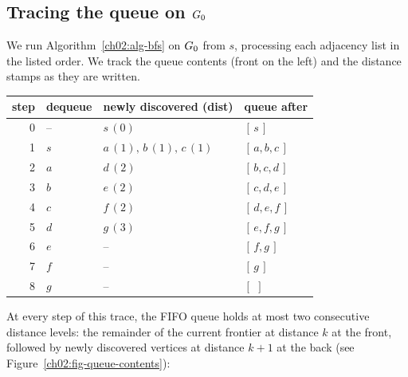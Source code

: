 \subsection{Tracing the queue on $G_0$}

We run Algorithm~\ref{ch02:alg-bfs} on $G_0$ from $s$, processing each
adjacency list in the listed order. We track the queue contents (front on the
left) and the distance stamps as they are written.

\begin{center}

\renewcommand{\arraystretch}{1.25}
\begin{longtable}{r l l l}
\toprule
step & dequeue & newly discovered (dist) & queue after \\
\midrule
0 & --        & $s\,(0)$                 & $[\,s\,]$ \\
1 & $s$       & $a\,(1),\,b\,(1),\,c\,(1)$ & $[\,a,b,c\,]$ \\
2 & $a$       & $d\,(2)$                  & $[\,b,c,d\,]$ \\
3 & $b$       & $e\,(2)$                  & $[\,c,d,e\,]$ \\
4 & $c$       & $f\,(2)$                  & $[\,d,e,f\,]$ \\
5 & $d$       & $g\,(3)$                  & $[\,e,f,g\,]$ \\
6 & $e$       & --                        & $[\,f,g\,]$ \\
7 & $f$       & --                        & $[\,g\,]$ \\
8 & $g$       & --                        & $[\,\ ]$ \\
\bottomrule
\end{longtable}
\end{center}

At every step of this trace, the FIFO queue holds at most two consecutive distance levels: the remainder of the current frontier at distance $k$ at the front, followed by newly discovered vertices at distance $k+1$ at the back (see Figure~\ref{ch02:fig-queue-contents}):

